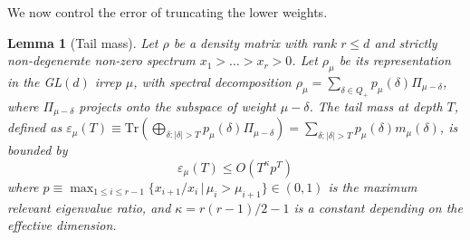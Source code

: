 \documentclass[11pt,letterpaper]{article}
\newtheorem{lem}{Lemma}
\def\eps{\varepsilon}
\newcommand*{\Tr}{\mathrm{Tr}}
\begin{document}
We now control the error of truncating the lower weights. 
\begin{lem}[Tail mass]\label{lem:tail}
Let $\rho$ be a density matrix with rank $r \le d$ and strictly non-degenerate non-zero spectrum $x_1 > \dots > x_r > 0$. Let $\rho_\mu$ be its representation in the GL$(d)$ irrep $\mu$, with spectral decomposition $\rho_\mu = \sum_{\delta\in Q_+} p_\mu(\delta) \Pi_{\mu-\delta}$, where $\Pi_{\mu-\delta}$ projects onto the subspace of weight $\mu-\delta$.
The tail mass at depth $T$, defined as $\eps_\mu(T)\equiv\Tr\left(\bigoplus_{\delta:|\delta|>T} p_\mu(\delta)\Pi_{\mu-\delta}\right)=\sum_{\delta:|\delta|>T}p_\mu(\delta) m_\mu(\delta)$, is bounded by
\begin{equation}
\eps_\mu(T)\leq O\left(T^\kappa p^T\right)
\end{equation}
where $p \equiv \max_{1 \le i \le r-1} \{x_{i+1}/x_i \,|\, \mu_i > \mu_{i+1}\} \in (0,1)$ is the maximum relevant eigenvalue ratio, and $\kappa = r(r-1)/2 - 1$ is a constant depending on the effective dimension.
\end{lem}
\end{document}
